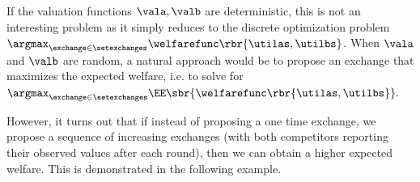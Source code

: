 If the valuation functions $\vala,\valb$ are deterministic, this is not an interesting problem as it simply reduces to 
the discrete optimization problem
\(
    \argmax_{
        \exchange\in\setexchanges
    }
    \welfarefunc\rbr{
        \utilas,\utilbs
    }
\). 
When $\vala$ and $\valb$ are random,
a natural approach would be to propose an
exchange that maximizes the expected welfare, i.e. to solve for 
\(
    \argmax_{
        \exchange\in\setexchanges
    }
    \EE\sbr{
        \welfarefunc\rbr{
            \utilas,\utilbs
        }
    } .
\)

However, it turns out that if instead of proposing a one time exchange, we propose a sequence of increasing
exchanges (with both competitors reporting their observed values after each round), then we can obtain a 
higher expected welfare. This is demonstrated in the following example.

